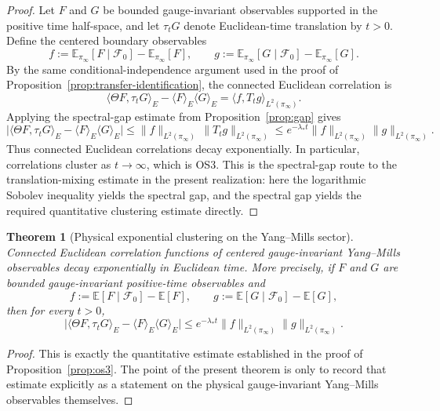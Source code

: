 \documentclass[11pt]{article}
\newtheorem{theorem}{Theorem}[section]
\theoremstyle{definition}
\theoremstyle{remark}
\begin{document}
\begin{proof}
Let $F$ and $G$ be bounded gauge-invariant observables supported in the positive
time half-space, and let $\tau_t G$ denote Euclidean-time translation by $t>0$.
Define the centered boundary observables
\[
f:=\mathbb E_{\pi_\infty}[F\mid\mathcal F_0]-\mathbb E_{\pi_\infty}[F],
\qquad
g:=\mathbb E_{\pi_\infty}[G\mid\mathcal F_0]-\mathbb E_{\pi_\infty}[G].
\]
By the same conditional-independence argument used in the proof of
Proposition~\ref{prop:transfer-identification}, the connected Euclidean
correlation is
\[
\langle \Theta F,\tau_t G\rangle_E
-\langle F\rangle_E\langle G\rangle_E
=
\langle f,T_t g\rangle_{L^2(\pi_\infty)}.
\]
Applying the spectral-gap estimate from Proposition~\ref{prop:gap} gives
\[
\bigl|
\langle \Theta F,\tau_t G\rangle_E
-\langle F\rangle_E\langle G\rangle_E
\bigr|
\le
\|f\|_{L^2(\pi_\infty)}\,
\|T_t g\|_{L^2(\pi_\infty)}
\le
e^{-\lambda_* t}\|f\|_{L^2(\pi_\infty)}\|g\|_{L^2(\pi_\infty)}.
\]
Thus connected Euclidean correlations decay exponentially.
In particular, correlations cluster as $t\to\infty$, which is OS3.  This is the
spectral-gap route to the translation-mixing estimate in the present
realization: here the logarithmic
Sobolev inequality yields the spectral gap, and the spectral gap yields the
required quantitative clustering estimate directly.
\end{proof}

\begin{theorem}[Physical exponential clustering on the Yang--Mills sector]
\label{thm:physical-clustering}
Connected Euclidean correlation functions of centered gauge-invariant
Yang--Mills observables decay exponentially in Euclidean time.  More precisely,
if \(F\) and \(G\) are bounded gauge-invariant positive-time observables and
\[
f:=\mathbb E[F\mid\mathcal F_0]-\mathbb E[F],
\qquad
g:=\mathbb E[G\mid\mathcal F_0]-\mathbb E[G],
\]
then for every \(t>0\),
\[
\bigl|
\langle \Theta F,\tau_t G\rangle_E
-\langle F\rangle_E\langle G\rangle_E
\bigr|
\le
e^{-\lambda_* t}\|f\|_{L^2(\pi_\infty)}\|g\|_{L^2(\pi_\infty)}.
\]
\end{theorem}

\begin{proof}
This is exactly the quantitative estimate established in the proof of
Proposition~\ref{prop:os3}.  The point of the present theorem is only to record
that estimate explicitly as a statement on the physical gauge-invariant
Yang--Mills observables themselves.
\end{proof}
\end{document}

